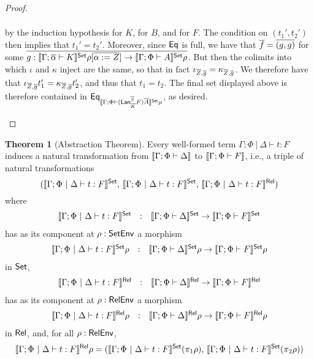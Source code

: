 \documentclass[acmsmall,review,anonymous]{acmart}
\theoremstyle{definition}
\newtheorem*{nono-theorem}{Theorem}
\begin{document}
\begin{proof}
\begin{itemize}
{\[\begin{array}{ll}
\end{array}\]
by the induction hypothesis for $K$, for $B$, and for $F$. The
condition on $(t_1', t_2')$ then implies that $t_1'=t_2'$.  Moreover,
since $\mathsf{Eq}$ is full, we have that $\overline{f} = \overline{(g,g)}$ for some
$\overline{g : \llbracket{\Gamma; \overline{\alpha} \vdash K}\rrbracket^{\mathsf{Set}}\rho[\overline{\alpha := Z}]
  \to \llbracket{\Gamma; \Phi \vdash A}\rrbracket^{\mathsf{Set}}\rho}$. But then the colimits
into which $\iota$ and $\kappa$ inject are the same, so that in fact
$\iota_{\overline{Z},\overline{g}} = \kappa_{\overline{Z},\overline{g}}$. We therefore have that
$\iota_{\overline{Z},\overline{g}} t_1' = \kappa_{\overline{Z},\overline{g}} t_2'$, and thus that
$t_1 = t_2$. The final set displayed above is therefore contained in $
\mathsf{Eq}_{\llbracket{\Gamma; \Phi \vdash (\mathsf{Lan}_{\overline{K}}^{\overline{\beta}}
    F)\overline{A}}\rrbracket^{\mathsf{Set}}\rho}$, as desired.}
\end{itemize}
\end{proof}


\begin{nono-theorem}[Abstraction Theorem]\label{thm:at-gen}
Every well-formed term $\Gamma;\Phi~|~\Delta \vdash t : F$ induces
a natural transformation from $\llbracket{\Gamma; \Phi \vdash \Delta}\rrbracket$ to
$\llbracket{\Gamma; \Phi \vdash F}\rrbracket$, i.e., a triple of natural
transformations 
\[(\llbracket{\Gamma;\Phi~|~\Delta \vdash t : F}\rrbracket^{\mathsf{Set}},\,
\llbracket{\Gamma;\Phi~|~\Delta \vdash t : F}\rrbracket^{\mathsf{Set}},\,
\llbracket{\Gamma;\Phi~|~\Delta \vdash t : F}\rrbracket^{\mathsf{Rel}})\]
where
\[\begin{array}{lll}
\llbracket{\Gamma;\Phi~|~\Delta \vdash t : F}\rrbracket^{\mathsf{Set}} & : & \llbracket{\Gamma;
  \Phi \vdash \Delta}\rrbracket^{\mathsf{Set}} \to \llbracket{\Gamma; \Phi \vdash F}\rrbracket^{\mathsf{Set}}
\end{array}\]
has as its component at $\rho : \mathsf{SetEnv}$ a morphism
\[\begin{array}{lll}
\llbracket{\Gamma;\Phi~|~\Delta \vdash t : F}\rrbracket^{\mathsf{Set}}\rho & : & \llbracket{\Gamma;
  \Phi \vdash \Delta}\rrbracket^{\mathsf{Set}}\rho \to \llbracket{\Gamma; \Phi \vdash F}\rrbracket^{\mathsf{Set}}\rho
\end{array}\]
in ${\mathsf{Set}}$,
\[\begin{array}{lll}
\llbracket{\Gamma;\Phi~|~\Delta \vdash t : F}\rrbracket^{\mathsf{Rel}} & : & \llbracket{\Gamma;
  \Phi \vdash \Delta}\rrbracket^{\mathsf{Rel}} \to \llbracket{\Gamma; \Phi \vdash F}\rrbracket^{\mathsf{Rel}}
\end{array}\]
has as its component at $\rho : \mathsf{RelEnv}$ a morphism
\[\begin{array}{lll}
\llbracket{\Gamma;\Phi~|~\Delta \vdash t : F}\rrbracket^{\mathsf{Rel}}\rho & : & \llbracket{\Gamma;
  \Phi \vdash \Delta}\rrbracket^{\mathsf{Rel}}\rho \to \llbracket{\Gamma; \Phi \vdash F}\rrbracket^{\mathsf{Rel}}\rho
\end{array}\]
in ${\mathsf{Rel}}$,
and, for all $\rho : \mathsf{RelEnv}$,
\begin{equation}\label{eq:projs}
\llbracket{\Gamma;\Phi~|~\Delta \vdash t : F}\rrbracket^{\mathsf{Rel}}\rho =
(\llbracket{\Gamma;\Phi~|~\Delta \vdash t : F}\rrbracket^{\mathsf{Set}}(\pi_1 \rho),\,
\llbracket{\Gamma;\Phi~|~\Delta \vdash t : F}\rrbracket^{\mathsf{Set}}(\pi_2 \rho))
\end{equation}
\end{nono-theorem}
\end{document}
